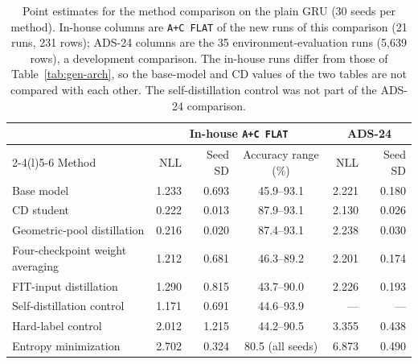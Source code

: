 \begin{table}[htbp]
\centering
\caption[Point estimates for the method comparison on the plain GRU]{Point estimates for the method comparison on the plain GRU
(30 seeds per method). In-house columns are \texttt{A+C FLAT} of the
new runs of this comparison (21 runs, 231 rows); ADS-24 columns are the
35 environment-evaluation runs (5,639 rows), a development comparison.
The in-house runs differ from those of Table~\ref{tab:gen-arch}, so the
base-model and CD values of the two tables are not compared with each
other. The self-distillation control was not part of the ADS-24 comparison.}
\label{tab:gen-methods}
\small
\begin{tabular}{@{}lrrcrr@{}}
\toprule
 & \multicolumn{3}{c}{In-house \texttt{A+C FLAT}}
 & \multicolumn{2}{c}{ADS-24} \\
\cmidrule(lr){2-4}\cmidrule(l){5-6}
Method & NLL & Seed SD & Accuracy range (\%) & NLL & Seed SD \\
\midrule
Base model                    & 1.233 & 0.693 & 45.9--93.1 & 2.221 & 0.180 \\
CD student                    & 0.222 & 0.013 & 87.9--93.1 & 2.130 & 0.026 \\
Geometric-pool distillation   & 0.216 & 0.020 & 87.4--93.1 & 2.238 & 0.030 \\
Four-checkpoint weight averaging & 1.212 & 0.681 & 46.3--89.2 & 2.201 & 0.174 \\
FIT-input distillation        & 1.290 & 0.815 & 43.7--90.0 & 2.226 & 0.193 \\
Self-distillation control     & 1.171 & 0.691 & 44.6--93.9 & ---   & ---   \\
Hard-label control            & 2.012 & 1.215 & 44.2--90.5 & 3.355 & 0.438 \\
Entropy minimization          & 2.702 & 0.324 & 80.5 (all seeds) & 6.873 & 0.490 \\
\bottomrule
\end{tabular}
\end{table}

